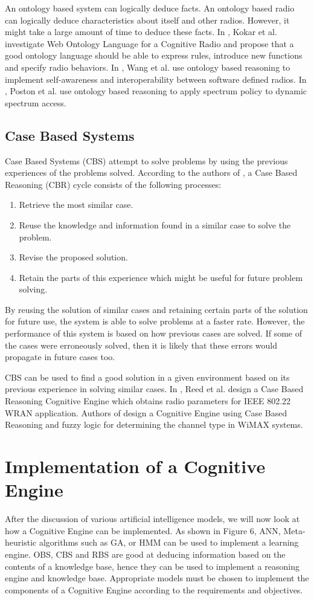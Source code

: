 \documentclass[conference]{IEEEtran}
\begin{document}
    An ontology based system can logically deduce facts. An ontology based radio can logically deduce characteristics about itself and other radios. However, it might take a large amount of time to deduce these facts. In \cite{16}, Kokar et al. investigate Web Ontology Language for a Cognitive Radio and propose that a good ontology language should be able to express rules, introduce new functions and specify radio behaviors. In \cite{17}, Wang et al. use ontology based reasoning to implement self-awareness and interoperability between software defined radios. In \cite{18}, Poston et al. use ontology based reasoning to apply spectrum policy to dynamic spectrum access.

\subsection{Case Based Systems}
	Case Based Systems (CBS) attempt to solve problems by using the previous experiences of the problems solved. According to the authors of \cite{19}, a Case Based Reasoning (CBR) cycle consists of the following processes: 
\begin{enumerate}
\item Retrieve the most similar case.
\item Reuse the knowledge and information found in a similar case to solve the problem.
\item Revise the proposed solution.
\item Retain the parts of this experience which might be useful for future problem solving. 
\end{enumerate}

	By reusing the solution of similar cases and retaining certain parts of the solution for future use, the system is able to solve problems at a faster rate. However, the performance of this system is based on how previous cases are solved. If some of the cases were erroneously solved, then it is likely that these errors would propagate in future cases too. 

	CBS can be used to find a good solution in a given environment based on its previous experience in solving similar cases. In \cite{20}, Reed et al. design a Case Based Reasoning Cognitive Engine which obtains radio parameters for IEEE 802.22 WRAN application. Authors of \cite{21} design a Cognitive Engine using Case Based Reasoning and fuzzy logic for determining the channel type in WiMAX systems.
    
\section{Implementation of a Cognitive Engine}
    After the discussion of various artificial intelligence models, we will now look at how a Cognitive Engine can be implemented. As shown in Figure 6, ANN, Meta-heuristic algorithms such as GA, or HMM can be used to implement a learning engine. OBS, CBS and RBS are good at deducing information based on the contents of a knowledge base, hence they can be used to implement a reasoning engine and knowledge base. Appropriate models must be chosen to implement the components of a Cognitive Engine according to the requirements and objectives. 
    
\end{document}
